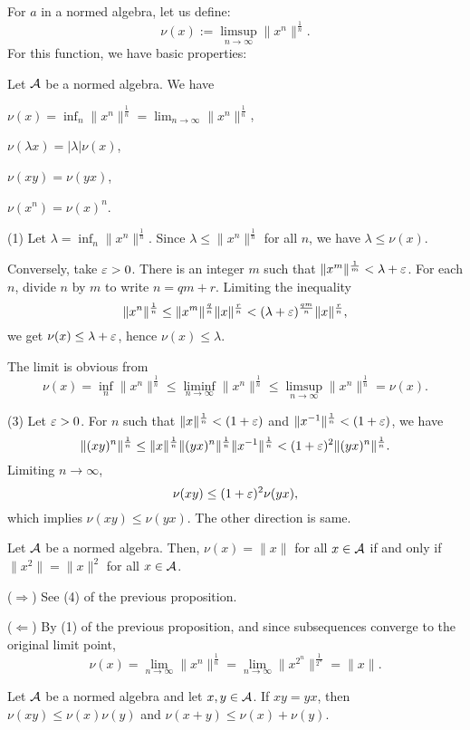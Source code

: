 \documentclass{../crs}
\begin{document}
For $a$ in a normed algebra, let us define:
\[\nu(x):=\limsup_{n\to\infty}\|x^n\|^{\frac1n}.\]
For this function, we have basic properties:
\begin{prop}
Let $\mathcal{A}$ be a normed algebra.
We have
\begin{cond}
\item $\nu(x)=\inf_n\|x^n\|^{\frac1n}=\lim_{n\to\infty}\|x^n\|^{\frac1n}$,
\item $\nu(\lambda x)=|\lambda|\nu(x)$,
\item $\nu(xy)=\nu(yx)$,
\item $\nu(x^n)=\nu(x)^n$.
\end{cond}
\end{prop}
\begin{pf}
(1)
Let $\lambda=\inf_n\|x^n\|^{\frac1n}$.
Since $\lambda\le\|x^n\|^{\frac1n}$ for all $n$, we have $\lambda\le\nu(x)$.

Conversely, take $\varepsilon>0$.
There is an integer $m$ such that $\|x^m\|^{\frac1m}<\lambda+\varepsilon$.
For each $n$, divide $n$ by $m$ to write $n=qm+r$.
Limiting the inequality
\[\|x^n\|^{\frac1n}\le\|x^m\|^{\frac qn}\|x\|^{\frac rn}<(\lambda+\varepsilon)^{\frac{qm}n}\|x\|^{\frac rn},\]
we get $\nu(x)\le\lambda+\varepsilon$, hence $\nu(x)\le\lambda$.

The limit is obvious from
\[\nu(x)=\inf_n\|x^n\|^{\frac1n}\le\liminf_{n\to\infty}\|x^n\|^{\frac1n}\le\limsup_{n\to\infty}\|x^n\|^{\frac1n}=\nu(x).\]

(3)
Let $\varepsilon>0$.
For $n$ such that $\|x\|^{\frac1n}<(1+\varepsilon)$ and $\|x^{-1}\|^{\frac1n}<(1+\varepsilon)$, we have
\[\|(xy)^n\|^{\frac1n}\le\|x\|^{\frac1n}\|(yx)^n\|^{\frac1n}\|x^{-1}\|^{\frac1n}<(1+\varepsilon)^2\|(yx)^n\|^{\frac1n}.\]
Limiting $n\to\infty$,
\[\nu(xy)\le(1+\varepsilon)^2\nu(yx),\]
which implies $\nu(xy)\le\nu(yx)$.
The other direction is same.
\end{pf}
\begin{thm}
Let $\mathcal{A}$ be a normed algebra.
Then, $\nu(x)=\|x\|$ for all $x\in\mathcal{A}$ if and only if $\|x^2\|=\|x\|^2$ for all $x\in\mathcal{A}$.
\end{thm}
\begin{pf}
($\Rightarrow$)
See (4) of the previous proposition.

($\Leftarrow$)
By (1) of the previous proposition, and since subsequences converge to the original limit point,
\[\nu(x)=\lim_{n\to\infty}\|x^n\|^{\frac1n}=\lim_{n\to\infty}\|x^{2^n}\|^{\frac1{2^n}}=\|x\|.\]
\end{pf}
\begin{thm}
Let $\mathcal{A}$ be a normed algebra and let $x,y\in\mathcal{A}$.
If $xy=yx$, then $\nu(xy)\le \nu(x)\nu(y)$ and $\nu(x+y)\le\nu(x)+\nu(y)$.
\end{thm}
\end{document}
